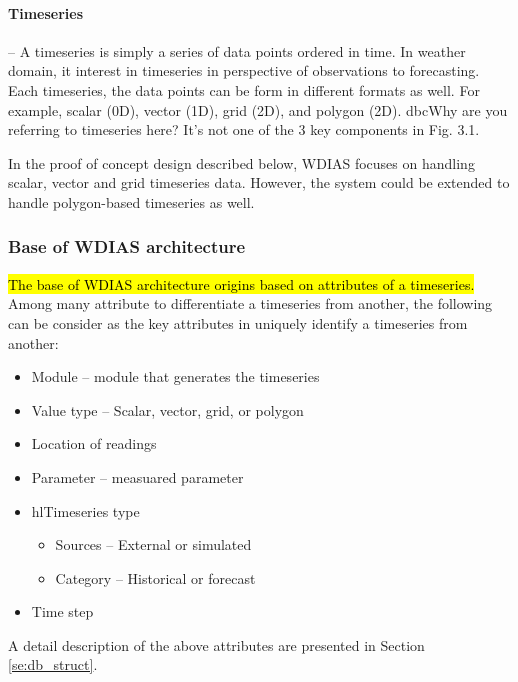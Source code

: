 \paragraph{Timeseries}-- A timeseries is simply a series of data points ordered in time. In weather domain, it interest in timeseries in perspective of observations to forecasting. Each timeseries, the data points can be form in different formats as well. For example, scalar (0D), vector (1D), grid (2D), and polygon (2D).
dbc{Why are you referring to timeseries here? It's not one of the 3 key components in Fig. 3.1.}

In the proof of concept design described below, WDIAS focuses on handling scalar, vector and grid timeseries data. However, the system could be extended to handle polygon-based timeseries as well.

\subsubsection{Base of WDIAS architecture}
\hl{The base of WDIAS architecture origins based on attributes of a timeseries.} %
Among many attribute to differentiate a timeseries from another, the following can be consider as the key attributes in uniquely identify a timeseries from another: %

\begin{itemize}
    \item Module -- module that generates the timeseries
    \item Value type -- Scalar, vector, grid, or polygon
    \item Location of readings
    \item Parameter -- measuared parameter
    \item hl{Timeseries type}
    \begin{itemize}
        \item Sources -- External or simulated
        \item Category -- Historical or forecast
    \end{itemize}
    \item Time step
\end{itemize}

A detail description of the above attributes are presented in Section \ref{se:db_struct}.